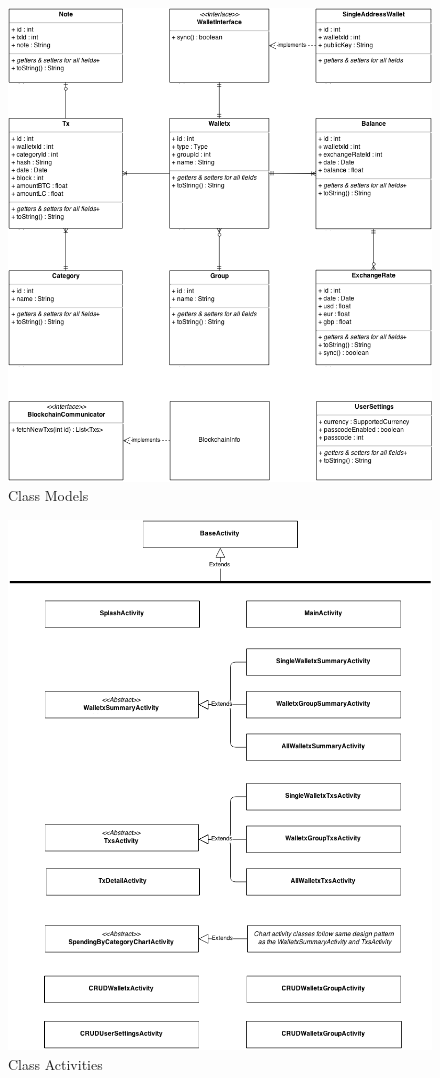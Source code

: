 \begin{figure}[H]
	\centering
	\includegraphics[scale=0.5]{../diagrams/classes_model.png}
	\caption{Class Models}
\end{figure}


\begin{figure}[H]
	\centering
	\includegraphics[scale=0.5]{../diagrams/classes_activity.png}
	\caption{Class Activities}
\end{figure}

